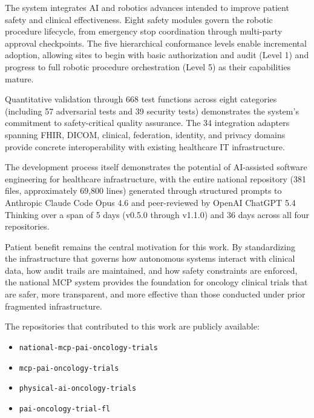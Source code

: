 The system integrates AI and robotics advances intended to improve patient safety and clinical effectiveness. Eight safety modules govern the robotic procedure lifecycle, from emergency stop coordination through multi-party approval checkpoints. The five hierarchical conformance levels enable incremental adoption, allowing sites to begin with basic authorization and audit (Level 1) and progress to full robotic procedure orchestration (Level 5) as their capabilities mature.

Quantitative validation through 668 test functions across eight categories (including 57 adversarial tests and 39 security tests) demonstrates the system's commitment to safety-critical quality assurance. The 34 integration adapters spanning FHIR, DICOM, clinical, federation, identity, and privacy domains provide concrete interoperability with existing healthcare IT infrastructure.

The development process itself demonstrates the potential of AI-assisted software engineering for healthcare infrastructure, with the entire national repository (381 files, approximately 69,800 lines) generated through structured prompts to Anthropic Claude Code Opus 4.6 and peer-reviewed by OpenAI ChatGPT 5.4 Thinking over a span of 5 days (v0.5.0 through v1.1.0) and 36 days across all four repositories.

Patient benefit remains the central motivation for this work. By standardizing the infrastructure that governs how autonomous systems interact with clinical data, how audit trails are maintained, and how safety constraints are enforced, the national MCP system provides the foundation for oncology clinical trials that are safer, more transparent, and more effective than those conducted under prior fragmented infrastructure.

The repositories that contributed to this work are publicly available:
\begin{itemize}[leftmargin=*]
\item \texttt{national-mcp-pai-oncology-trials}~\cite{kawchak2026national}
\item \texttt{mcp-pai-oncology-trials}~\cite{kawchak2026trialmcp}
\item \texttt{physical-ai-oncology-trials}~\cite{kawchak2026physicalai}
\item \texttt{pai-oncology-trial-fl}~\cite{kawchak2026paifl}
\end{itemize}





